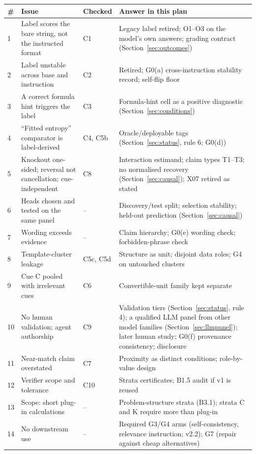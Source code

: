 \documentclass[10pt,a4paper]{article}
\begin{document}
\begin{center}\small
\begin{longtable}{@{}P{0.6cm}P{5.8cm}P{1.5cm}P{7.5cm}@{}}
\toprule
\# & Issue & Checked & Answer in this plan \\
\midrule{} & Label scores the bare string, not the instructed format & C1 & Legacy label retired; O1--O3 on the model's own answers; grading contract (Section~\ref{sec:outcomes}) \\
2 & Label unstable across base and instruction & C2 & Retired; G0(a) cross-instruction stability record; self-flip floor \\
3 & A correct formula hint triggers the label & C3 & Formula-hint cell as a positive diagnostic (Section~\ref{sec:conditions}) \\
4 & ``Fitted entropy'' comparator is label-derived & C4, C5b & Oracle/deployable tags (Section~\ref{sec:status}, rule 6; G0(d)) \\
5 & Knockout one-sided; reversal not cancellation; cue-independent & C8 & Interaction estimand; claim types T1--T3; no normalised recovery (Section~\ref{sec:causal}); X07 retired as stated \\
6 & Heads chosen and tested on the same panel & -- & Discovery/test split; selection stability; held-out prediction (Section~\ref{sec:causal}) \\
7 & Wording exceeds evidence & -- & Claim hierarchy; G0(e) wording check; forbidden-phrase check \\
8 & Template-cluster leakage & C5c, C5d & Structure as unit; disjoint data roles; G4 on untouched clusters \\
9 & Cue C pooled with irrelevant cues & C6 & Convertible-unit family kept separate \\
10 & No human validation; agent authorship & C9 & Validation tiers (Section~\ref{sec:status}, rule 4); a qualified LLM panel from other model families (Section~\ref{sec:llmpanel}); later human study; G0(f) provenance consistency; disclosure \\
11 & Near-match claim overstated & C7 & Proximity as distinct conditions; role-by-value design \\
12 & Verifier scope and tolerance & C10 & Strata certificates; B1.5 audit if v1 is reused \\
13 & Scope: short plug-in calculations & -- & Problem-structure strata (B3.1); strata C and K require more than plug-in \\
14 & No downstream use & -- & Required G3/G4 arms (self-consistency, relevance instruction; v2.2); G7 (repair against cheap alternatives) \\

\end{longtable}
\end{center}
\end{document}
